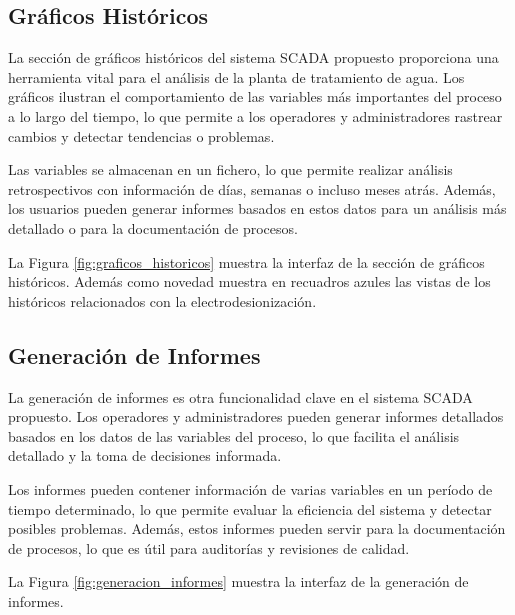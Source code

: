  
\subsection{Gráficos Históricos}

La sección de gráficos históricos del sistema SCADA propuesto proporciona una herramienta vital para el análisis de la planta de tratamiento de agua. Los gráficos ilustran el comportamiento de las variables más importantes del proceso a lo largo del tiempo, lo que permite a los operadores y administradores rastrear cambios y detectar tendencias o problemas.

Las variables se almacenan en un fichero, lo que permite realizar análisis retrospectivos con información de días, semanas o incluso meses atrás. Además, los usuarios pueden generar informes basados en estos datos para un análisis más detallado o para la documentación de procesos.

La Figura \ref{fig:graficos_historicos} muestra la interfaz de la sección de gráficos históricos.
Además como novedad muestra en recuadros azules las vistas de los históricos relacionados con la electrodesionización.


\subsection{Generación de Informes}

La generación de informes es otra funcionalidad clave en el sistema SCADA propuesto. Los operadores y administradores pueden generar informes detallados basados en los datos de las variables del proceso, lo que facilita el análisis detallado y la toma de decisiones informada.

Los informes pueden contener información de varias variables en un período de tiempo determinado, lo que permite evaluar la eficiencia del sistema y detectar posibles problemas. Además, estos informes pueden servir para la documentación de procesos, lo que es útil para auditorías y revisiones de calidad.

La Figura \ref{fig:generacion_informes} muestra la interfaz de la generación de informes.





